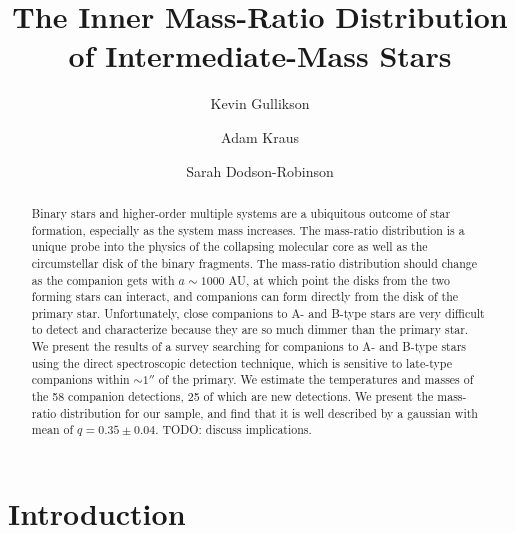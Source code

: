 \documentclass{emulateapj}
\begin{document}
\title{The Inner Mass-Ratio Distribution of Intermediate-Mass Stars}

\author{Kevin Gullikson }
\author{Adam Kraus }
\author{Sarah Dodson-Robinson }



\begin{abstract}
Binary stars and higher-order multiple systems are a ubiquitous outcome of star formation, especially as the system mass increases. The mass-ratio distribution is a unique probe into the physics of the collapsing molecular core as well as the circumstellar disk of the binary fragments. The mass-ratio distribution should change as the companion gets with $a \sim 1000$ AU, at which point the disks from the two forming stars can interact, and companions can form directly from the disk of the primary star. Unfortunately, close companions to A- and B-type stars are very difficult to detect and characterize because they are so much dimmer than the primary star. We present the results of a survey searching for companions to A- and B-type stars using the direct spectroscopic detection technique, which is sensitive to late-type companions within $\sim 1''$ of the primary. We estimate the temperatures and masses of the 58 companion detections, 25 of which are new detections. We present the mass-ratio distribution for our sample, and find that it is well described by a gaussian with mean of $q = 0.35 \pm 0.04$. TODO: discuss implications.
\end{abstract}

\maketitle

\section{Introduction}


\label{sec:intro}
\end{document}
